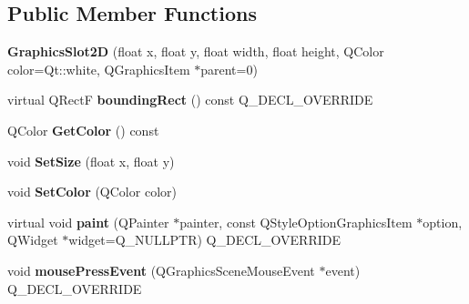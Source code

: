 \subsection*{Public Member Functions}
\begin{DoxyCompactItemize}
\item 
\hypertarget{classGraphicsSlot2D_a727b75d36aeec94cb0ea7ba87d2b4018}{{\bfseries Graphics\-Slot2\-D} (float x, float y, float width, float height, Q\-Color color=Qt\-::white, Q\-Graphics\-Item $\ast$parent=0)}\label{classGraphicsSlot2D_a727b75d36aeec94cb0ea7ba87d2b4018}

\item 
\hypertarget{classGraphicsSlot2D_a91bbc858f2f966d88f5dfc3a9255b262}{virtual Q\-Rect\-F {\bfseries bounding\-Rect} () const Q\-\_\-\-D\-E\-C\-L\-\_\-\-O\-V\-E\-R\-R\-I\-D\-E}\label{classGraphicsSlot2D_a91bbc858f2f966d88f5dfc3a9255b262}

\item 
\hypertarget{classGraphicsSlot2D_acb9706b9269de9e2a8221b34d117e66e}{Q\-Color {\bfseries Get\-Color} () const }\label{classGraphicsSlot2D_acb9706b9269de9e2a8221b34d117e66e}

\item 
\hypertarget{classGraphicsSlot2D_aa505d921ccd7d8e92ee2b5d028b768c4}{void {\bfseries Set\-Size} (float x, float y)}\label{classGraphicsSlot2D_aa505d921ccd7d8e92ee2b5d028b768c4}

\item 
\hypertarget{classGraphicsSlot2D_a6e7ccd8e16d8cb8b558eaddfbe4ac3b5}{void {\bfseries Set\-Color} (Q\-Color color)}\label{classGraphicsSlot2D_a6e7ccd8e16d8cb8b558eaddfbe4ac3b5}

\item 
\hypertarget{classGraphicsSlot2D_a28747f4550d08b4fe2853d820b936127}{virtual void {\bfseries paint} (Q\-Painter $\ast$painter, const Q\-Style\-Option\-Graphics\-Item $\ast$option, Q\-Widget $\ast$widget=Q\-\_\-\-N\-U\-L\-L\-P\-T\-R) Q\-\_\-\-D\-E\-C\-L\-\_\-\-O\-V\-E\-R\-R\-I\-D\-E}\label{classGraphicsSlot2D_a28747f4550d08b4fe2853d820b936127}

\item 
\hypertarget{classGraphicsSlot2D_acef178475ff7ac3d225e2fa255ceef0d}{void {\bfseries mouse\-Press\-Event} (Q\-Graphics\-Scene\-Mouse\-Event $\ast$event) Q\-\_\-\-D\-E\-C\-L\-\_\-\-O\-V\-E\-R\-R\-I\-D\-E}\label{classGraphicsSlot2D_acef178475ff7ac3d225e2fa255ceef0d}

\end{DoxyCompactItemize}


